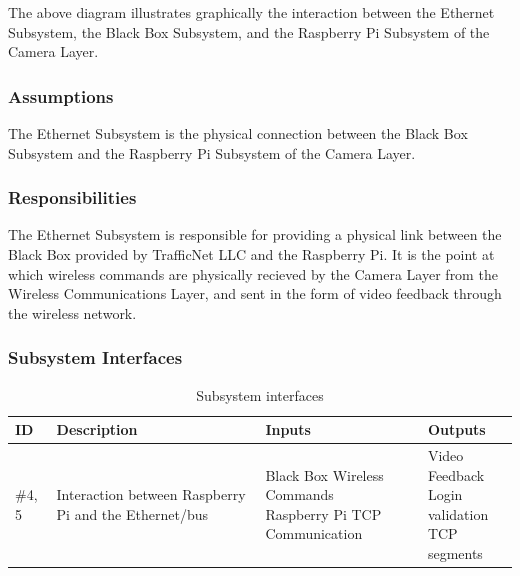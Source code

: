 The above diagram illustrates graphically the interaction between the Ethernet Subsystem, the Black Box Subsystem, and the Raspberry Pi Subsystem of the Camera Layer. 

\subsubsection{Assumptions}
The Ethernet Subsystem is the physical connection between the Black Box Subsystem and the Raspberry Pi Subsystem of the Camera Layer.

\subsubsection{Responsibilities}
The Ethernet Subsystem is responsible for providing a physical link between the Black Box provided by TrafficNet LLC and the Raspberry Pi. It is the point at which wireless commands are physically recieved by the Camera Layer from the Wireless Communications Layer, and sent in the form of video feedback through the wireless network.

\subsubsection{Subsystem Interfaces}

\begin {table}[H]
\caption {Subsystem interfaces} 
\begin{center}
    \begin{tabular}{ | p{1cm} | p{6cm} | p{3cm} | p{3cm} |}
    \hline
    ID & Description & Inputs & Outputs \\ \hline
    \#4, 5 & Interaction between Raspberry Pi and the Ethernet/bus & \pbox{3cm}{Black Box Wireless Commands \\ Raspberry Pi TCP Communication} & \pbox{3cm}{Video Feedback \\ Login validation \\ TCP segments}  \\ \hline
    \end{tabular}
\end{center}
\end{table}
